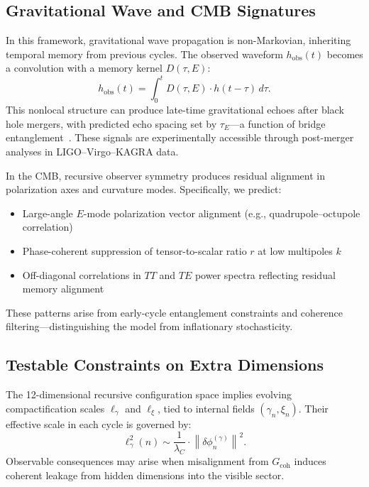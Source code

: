 \documentclass[11pt]{article}
\begin{document}
\subsection{Gravitational Wave and CMB Signatures}

In this framework, gravitational wave propagation is non-Markovian, inheriting temporal memory from previous cycles. The observed waveform $h_{\text{obs}}(t)$ becomes a convolution with a memory kernel $D(\tau, E)$:
\[
h_{\text{obs}}(t) = \int_0^t D(\tau, E) \cdot h(t - \tau) \, d\tau.
\]
This nonlocal structure can produce late-time gravitational echoes after black hole mergers, with predicted echo spacing set by $\tau_E$—a function of bridge entanglement~\cite{abedi2017echo, cardoso2016echoes}. These signals are experimentally accessible through post-merger analyses in LIGO–Virgo–KAGRA data.

In the CMB, recursive observer symmetry produces residual alignment in polarization axes and curvature modes. Specifically, we predict:

\begin{itemize}[leftmargin=1.5em]
\item Large-angle $E$-mode polarization vector alignment (e.g., quadrupole–octupole correlation)~\cite{planck2018cmb}
\item Phase-coherent suppression of tensor-to-scalar ratio $r$ at low multipoles $k$
\item Off-diagonal correlations in $TT$ and $TE$ power spectra reflecting residual memory alignment
\end{itemize}

These patterns arise from early-cycle entanglement constraints and coherence filtering—distinguishing the model from inflationary stochasticity.

\subsection{Testable Constraints on Extra Dimensions}

The 12-dimensional recursive configuration space implies evolving compactification scales $\ell_{\gamma}$ and $\ell_{\xi}$, tied to internal fields $(\gamma_n, \xi_n)$. Their effective scale in each cycle is governed by:
\[
\ell_{\gamma}^2(n) \sim \frac{1}{\lambda_C} \cdot \left\| \delta \phi_n^{(\gamma)} \right\|^2.
\]
Observable consequences may arise when misalignment from $G_{\text{coh}}$ induces coherent leakage from hidden dimensions into the visible sector.
\end{document}
